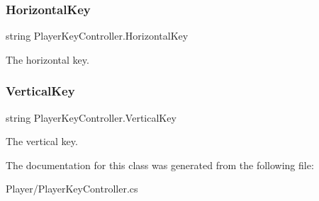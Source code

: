\subsubsection{\texorpdfstring{Horizontal\+Key}{HorizontalKey}}
{\footnotesize\ttfamily string Player\+Key\+Controller.\+Horizontal\+Key}



The horizontal key. 

\mbox{\label{class_player_key_controller_af6f283b7608be96f62f9af15b75c2691}} 
\subsubsection{\texorpdfstring{Vertical\+Key}{VerticalKey}}
{\footnotesize\ttfamily string Player\+Key\+Controller.\+Vertical\+Key}



The vertical key. 



The documentation for this class was generated from the following file\+:\begin{DoxyCompactItemize}
\item 
Player/Player\+Key\+Controller.\+cs\end{DoxyCompactItemize}
